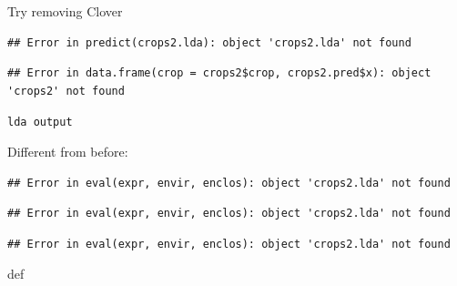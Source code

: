 \documentclass[ignorenonframetext,]{beamer}
\newenvironment{Shaded}{\begin{snugshade}}{\end{snugshade}}
\newcommand{\DataTypeTok}[1]{\textcolor[rgb]{0.13,0.29,0.53}{#1}}
\newcommand{\KeywordTok}[1]{\textcolor[rgb]{0.13,0.29,0.53}{\textbf{#1}}}
\newcommand{\NormalTok}[1]{#1}
\newcommand{\OperatorTok}[1]{\textcolor[rgb]{0.81,0.36,0.00}{\textbf{#1}}}
\newcommand{\StringTok}[1]{\textcolor[rgb]{0.31,0.60,0.02}{#1}}
\begin{document}
\begin{frame}[fragile]{Try removing Clover}
\begin{verbatim}
## Error in predict(crops2.lda): object 'crops2.lda' not found
\end{verbatim}

\begin{Shaded}
\end{Shaded}

\begin{verbatim}
## Error in data.frame(crop = crops2$crop, crops2.pred$x): object 'crops2' not found
\end{verbatim}

\end{frame}

\begin{frame}[fragile]{\texttt{lda\ output}}
\protect\hypertarget{lda-output}{}

Different from before:

\begin{Shaded}
\end{Shaded}

\begin{verbatim}
## Error in eval(expr, envir, enclos): object 'crops2.lda' not found
\end{verbatim}

\begin{Shaded}
\end{Shaded}

\begin{verbatim}
## Error in eval(expr, envir, enclos): object 'crops2.lda' not found
\end{verbatim}

\begin{Shaded}
\end{Shaded}

\begin{verbatim}
## Error in eval(expr, envir, enclos): object 'crops2.lda' not found
\end{verbatim}

def

\end{frame}
\end{document}
